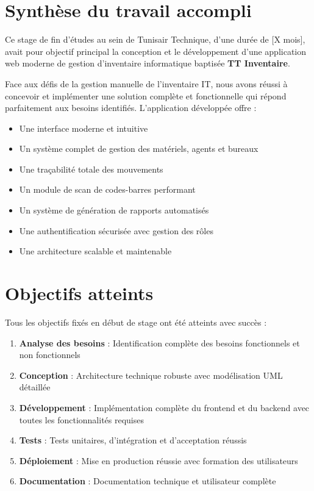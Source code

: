 \section*{Synthèse du travail accompli}

Ce stage de fin d'études au sein de Tunisair Technique, d'une durée de [X mois], avait pour objectif principal la conception et le développement d'une application web moderne de gestion d'inventaire informatique baptisée \textbf{TT Inventaire}.

Face aux défis de la gestion manuelle de l'inventaire IT, nous avons réussi à concevoir et implémenter une solution complète et fonctionnelle qui répond parfaitement aux besoins identifiés. L'application développée offre :

\begin{itemize}
    \item Une interface moderne et intuitive
    \item Un système complet de gestion des matériels, agents et bureaux
    \item Une traçabilité totale des mouvements
    \item Un module de scan de codes-barres performant
    \item Un système de génération de rapports automatisés
    \item Une authentification sécurisée avec gestion des rôles
    \item Une architecture scalable et maintenable
\end{itemize}

\section*{Objectifs atteints}

Tous les objectifs fixés en début de stage ont été atteints avec succès :

\begin{enumerate}
    \item \textbf{Analyse des besoins} : Identification complète des besoins fonctionnels et non fonctionnels
    
    \item \textbf{Conception} : Architecture technique robuste avec modélisation UML détaillée
    
    \item \textbf{Développement} : Implémentation complète du frontend et du backend avec toutes les fonctionnalités requises
    
    \item \textbf{Tests} : Tests unitaires, d'intégration et d'acceptation réussis
    
    \item \textbf{Déploiement} : Mise en production réussie avec formation des utilisateurs
    
    \item \textbf{Documentation} : Documentation technique et utilisateur complète
\end{enumerate}

